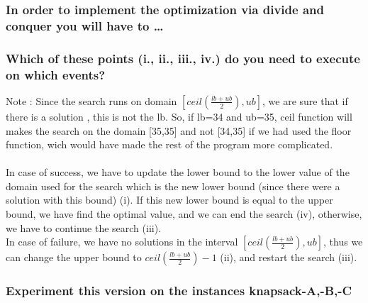 \documentclass[a4paper ,12pt,french]{article}
\begin{document}
\subsubsection{In order to implement the optimization via divide and conquer you will have to \dots}

\subsubsection{Which of these points (i., ii., iii., iv.) do you need to execute on which events?}
Note : Since the search runs on domain $[ceil(\frac{lb + ub}{2}),ub]$, we are sure that if there is a solution , this is not the lb. So, if lb=34 and ub=35, ceil function will makes the search on the domain [35,35] and not [34,35] if we had used the floor function, wich would have made the rest of the program more complicated.\\\\

In case of success, we have to update the lower bound to the lower value of the domain used for the search which is the new lower bound (since there were a solution with this bound) (i). If this new lower bound is equal to the upper bound, we have find the optimal value, and we can end the search (iv), otherwise, we have to continue the search (iii).\\

In case of failure, we have no solutions in the interval $[ceil(\frac{lb + ub}{2}),ub]$, thus we can change the upper bound to $ceil(\frac{lb + ub}{2})-1$ (ii), and restart the search (iii).\\


\subsubsection{Experiment this version on the instances knapsack-A,-B,-C}
\end{document}
